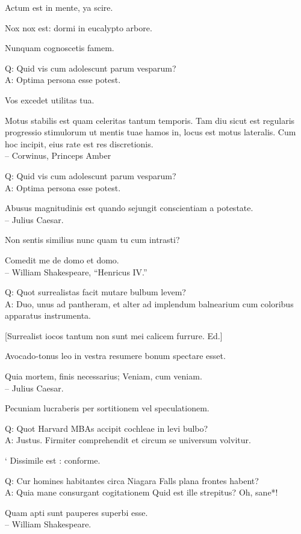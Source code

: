 \documentclass[titlepage,12pt]{memoir}
\begin{document}
Actum est in mente, ya scire.

Nox nox est: dormi in eucalypto arbore.

Nunquam cognoscetis famem.

Q: Quid vis cum adolescunt parum vesparum?\\
A: Optima persona esse potest.

Vos excedet utilitas tua.

Motus stabilis est quam celeritas tantum temporis. Tam diu
sicut est regularis progressio stimulorum ut mentis tuae hamos
in, locus est motus lateralis. Cum hoc incipit, eius rate est
res discretionis.
\\-- Corwinus, Princeps Amber

Q: Quid vis cum adolescunt parum vesparum?\\
A: Optima persona esse potest.

Abusus magnitudinis est quando sejungit conscientiam a potestate.
\\-- Julius Caesar.

Non sentis similius nunc quam tu cum intrasti?

Comedit me de domo et domo.
\\-- William Shakespeare, “Henricus IV.”

Q: Quot surrealistas facit mutare bulbum levem?\\
A: Duo, unus ad pantheram, et alter ad implendum balnearium
cum coloribus apparatus instrumenta.

[Surrealist iocos tantum non sunt mei calicem furrure. Ed.]

Avocado-tonus leo in vestra resumere bonum spectare esset.

Quia mortem, finis necessarius;
Veniam, cum veniam.
\\-- Julius Caesar.

Pecuniam lucraberis per sortitionem vel speculationem.

Q: Quot Harvard MBAs accipit cochleae in levi bulbo?\\
A: Justus. Firmiter comprehendit et circum se universum volvitur.

‘ Dissimile est : conforme.

Q: Cur homines habitantes circa Niagara Falls plana frontes habent?\\
A: Quia mane consurgant cogitationem Quid est ille strepitus?
Oh, sane*!

Quam apti sunt pauperes superbi esse.
\\-- William Shakespeare.
\end{document}
